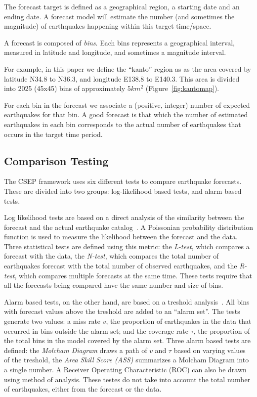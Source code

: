 \documentclass{sig-alternate}
\begin{document}
The forecast target is defined as a geographical region, a starting
date and an ending date. A forecast model will estimate the number
(and sometimes the magnitude) of earthquakes happening within this
target time/space.

A forecast is composed of \emph{bins}. Each bins represents a
geographical interval, measured in latitude and longitude, and
sometimes a magnitude interval. 

For example, in this paper we define the ``kanto'' region as as the
area covered by latitude N34.8 to N36.3, and longitude E138.8 to
E140.3. This area is divided into 2025 (45x45) bins of approximately
$5km^2$ (Figure~\ref{fig:kantomap}).

For each bin in the forecast we associate a (positive, integer) number
of expected earthquakes for that bin. A good forecast is that which
the number of estimated earthquakes in each bin corresponds to the
actual number of earthquakes that occurs in the target time period.

\subsection{Comparison Testing} 

The CSEP framework uses six different tests to compare earthquake
forecasts. These are divided into two groups: log-likelihood based
tests, and alarm based tests.

Log likelihood tests are based on a direct analysis of the similarity
between the forecast and the actual earthquake
catalog~\cite{Schorlemmer2007}. A Poissonian probability distribution
function is used to measure the likelihood between the forecast and
the data. Three statistical tests are defined using this metric: the
\emph{L-test}, which compares a forecast with the data, the
\emph{N-test}, which compares the total number of earthquakes forecast
with the total number of observed earthquakes, and the \emph{R-test},
which compares multiple forecasts at the same time. These tests
require that all the forecasts being compared have the same number and
size of bins.

Alarm based tests, on the other hand, are based on a treshold
analysis~\cite{Zechar2010}. All bins with forecast values above the
treshold are added to an ``alarm set''. The tests generate two values:
a miss rate $v$, the proportion of earthquakes in the data that
occurred in bins outside the alarm set; and the coverage rate $\tau$,
the proportion of the total bins in the model covered by the alarm
set. Three alarm based tests are defined: the \emph{Molcham Diagram}
draws a path of $v$ and $\tau$ based on varying values of the
treshold, the \emph{Area Skill Score (ASS)} summarizes a Molcham
Diagram into a single number. A Receiver Operating Characteristic
(ROC) can also be drawn using method of analysis. These testes do not
take into account the total number of earthquakes, either from the
forecast or the data.
\end{document}
